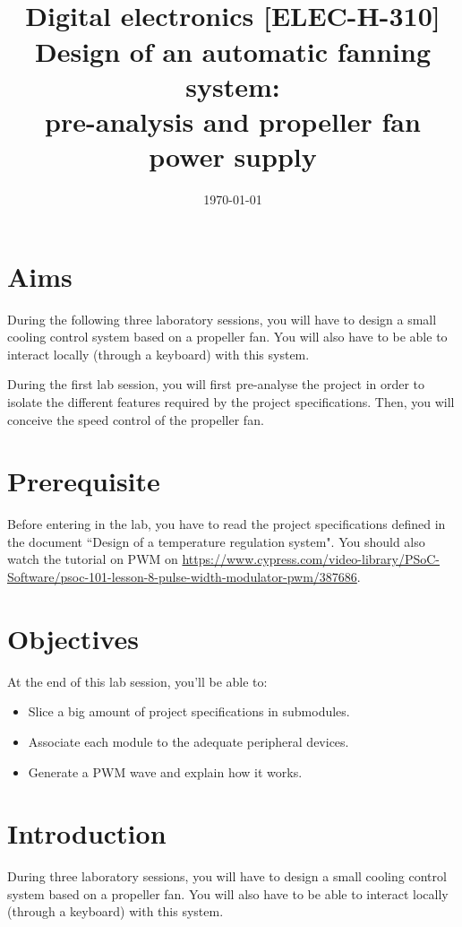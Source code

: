 \documentclass[11pt,a4paper]{article}
\date{\vspace{-1.7cm}\mydate\today}
\title{\vspace{-2cm}\labonumber \\ Digital electronics [ELEC-H-310]\\Design of an automatic fanning system: \\ pre-analysis and propeller fan power supply\ifthenelse{\boolean{corrige}}{~\\Corrigé}{}}
\theoremstyle{definition}%
\begin{document}
\pagestyle{empty}
\maketitle




\section*{Aims}
During the following three laboratory sessions, you will have to design a small cooling control system based on a propeller fan.
You will also have to be able to interact locally (through a keyboard) with this system.

During the first lab session, you will first pre-analyse the project in order to isolate the different features required by the project specifications.
Then, you will conceive the speed control of the propeller fan.

\section*{Prerequisite}
Before entering in the lab, you have to read the project specifications defined in the document ``Design of a temperature regulation system". You should also watch the tutorial on PWM on \url{https://www.cypress.com/video-library/PSoC-Software/psoc-101-lesson-8-pulse-width-modulator-pwm/387686}. 


\section*{Objectives}
At the end of this lab session, you'll be able to:
\begin{itemize}
	\item Slice a big amount of project specifications in submodules.
	\item Associate each module to the adequate peripheral devices.
	\item Generate a PWM wave and explain how it works.
\end{itemize}


\newpage




\section{Introduction}
During three laboratory sessions, you will have to design a small cooling control system based on a propeller fan.
You will also have to be able to interact locally (through a keyboard) with this system.
\end{document}

